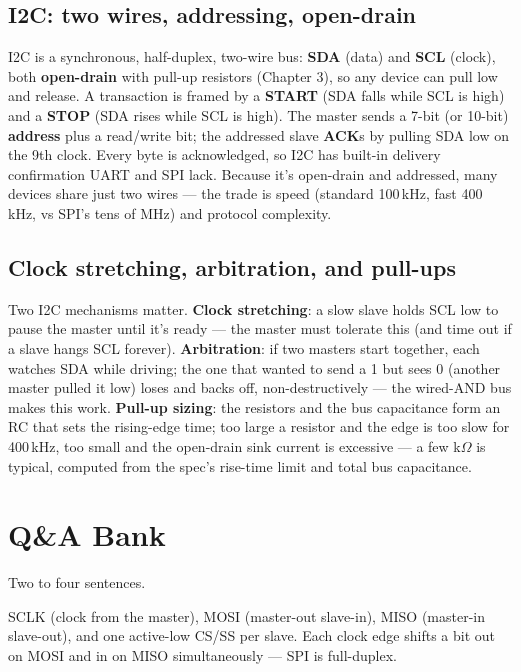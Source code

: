 \subsection{I2C: two wires, addressing, open-drain}

I2C is a synchronous, half-duplex, two-wire bus: \textbf{SDA} (data) and
\textbf{SCL} (clock), both \textbf{open-drain} with pull-up resistors (Chapter
3), so any device can pull low and release. A transaction is framed by a
\textbf{START} (SDA falls while SCL is high) and a \textbf{STOP} (SDA rises
while SCL is high). The master sends a 7-bit (or 10-bit) \textbf{address} plus
a read/write bit; the addressed slave \textbf{ACK}s by pulling SDA low on the
9th clock. Every byte is acknowledged, so I2C has built-in delivery
confirmation UART and SPI lack. Because it's open-drain and addressed, many
devices share just two wires --- the trade is speed (standard 100\,kHz, fast
400\,kHz, vs SPI's tens of MHz) and protocol complexity.

\subsection{Clock stretching, arbitration, and pull-ups}

Two I2C mechanisms matter. \textbf{Clock stretching}: a slow slave holds SCL low
to pause the master until it's ready --- the master must tolerate this (and time
out if a slave hangs SCL forever). \textbf{Arbitration}: if two masters start
together, each watches SDA while driving; the one that wanted to send a 1 but
sees 0 (another master pulled it low) loses and backs off, non-destructively ---
the wired-AND bus makes this work. \textbf{Pull-up sizing}: the resistors and
the bus capacitance form an RC that sets the rising-edge time; too large a
resistor and the edge is too slow for 400\,kHz, too small and the open-drain
sink current is excessive --- a few k$\Omega$ is typical, computed from the
spec's rise-time limit and total bus capacitance.

\section{Q\&A Bank}

%
{Two to four sentences.}

SCLK (clock from the master), MOSI (master-out slave-in), MISO (master-in
slave-out), and one active-low CS/SS per slave. Each clock edge shifts a bit out
on MOSI and in on MISO simultaneously --- SPI is full-duplex.

